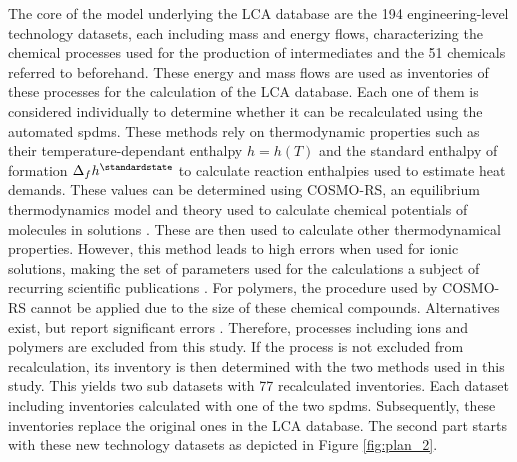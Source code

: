 The core of the model underlying the LCA database are the 194 engineering-level technology datasets, each including mass and energy flows, characterizing the chemical processes used for the production of intermediates and the 51 chemicals referred to beforehand. These energy and mass flows are used as inventories of these processes for the calculation of the LCA database. Each one of them is considered individually to determine whether it can be recalculated using the automated \aclp{spdm}. These methods rely on thermodynamic properties such as their temperature-dependant enthalpy $h = h(T)$ and the standard enthalpy of formation $\Delta_f h^\standardstate$ to calculate reaction enthalpies used to estimate heat demands. These values can be determined using COSMO-RS, an equilibrium thermodynamics model and theory used to calculate chemical potentials of molecules in solutions \cite{Klamt.1995}. These are then used to calculate other thermodynamical properties. However, this method leads to high errors when used for ionic solutions, making the set of parameters used for the calculations a subject of recurring scientific publications \cite{Han.2018, Liu.2018}. For polymers, the procedure used by COSMO-RS cannot be applied due to the size of these chemical compounds. Alternatives exist, but report significant errors \cite{SoftwareforChemistry&Materials.2020}. Therefore, processes including ions and polymers are excluded from this study. If the process is not excluded from recalculation, its inventory is then determined with the two methods used in this study. This yields two sub datasets with 77 recalculated inventories. Each dataset including inventories calculated with one of the two \aclp{spdm}. Subsequently, these inventories replace the original ones in the LCA database. The second part starts with these new technology datasets as depicted in Figure \ref{fig:plan_2}.


